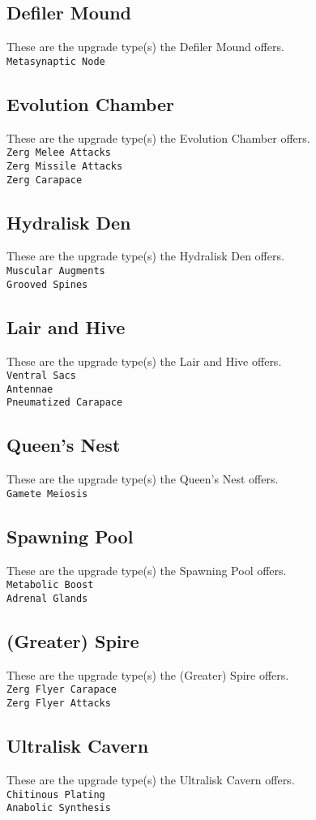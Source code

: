 \subsection{Defiler Mound}
These are the upgrade type(s) the Defiler Mound offers. \\
\verb|Metasynaptic Node|

\subsection{Evolution Chamber}
These are the upgrade type(s) the Evolution Chamber offers. \\
\verb|Zerg Melee Attacks|\\
\verb|Zerg Missile Attacks|\\
\verb|Zerg Carapace|

\subsection{Hydralisk Den}
These are the upgrade type(s) the Hydralisk Den offers. \\
\verb|Muscular Augments|\\
\verb|Grooved Spines|

\subsection{Lair and Hive}
These are the upgrade type(s) the Lair and Hive offers. \\
\verb|Ventral Sacs| \\
\verb|Antennae|\\
\verb|Pneumatized Carapace|

\subsection{Queen's Nest}
These are the upgrade type(s) the Queen's Nest offers. \\
\verb|Gamete Meiosis|

\subsection{Spawning Pool}
These are the upgrade type(s) the Spawning Pool offers. \\
\verb|Metabolic Boost|\\
\verb|Adrenal Glands|

\subsection{(Greater) Spire}
These are the upgrade type(s) the (Greater) Spire offers. \\
\verb|Zerg Flyer Carapace|\\
\verb|Zerg Flyer Attacks|

\subsection{Ultralisk Cavern}
These are the upgrade type(s) the Ultralisk Cavern offers. \\
\verb|Chitinous Plating|\\
\verb|Anabolic Synthesis|